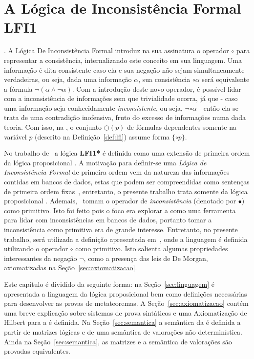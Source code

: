 \chapter{A Lógica de Inconsistência Formal LFI1}
\label{cap:LFI1}

. A Lógica De Inconsistência Formal \lfium{} introduz na sua assinatura o operador $\circ$ para representar a consistência, internalizando este conceito em sua linguagem. Uma informação é dita consistente caso ela e sua negação não sejam simultaneamente verdadeiras, ou seja, dada uma informação $\alpha$, sua consistência $\circ \alpha$ será equivalente a fórmula $\neg (\alpha \land \neg \alpha)$. Com a introdução deste novo operador, é possível lidar com a inconsistência de informações sem que trivialidade ocorra, já que {-} caso uma informação seja conhecidamente \textit{inconsistente}, ou seja, $\neg \circ \alpha$ {-} então ela se trata de uma contradição inofensiva, fruto do excesso de informações numa dada teoria. Com isso, na \lfium{}, o conjunto $\bigcirc(p)$ de fórmulas dependentes somente na variável $p$ (descrito na Definição~\ref{def:lfi}) assume forma $\{\circ p\}$.

No trabalho de~ a lógica \textbf{LFI1*} é definida como uma extensão de primeira ordem da lógica proposicional \lfium{}. A motivação para definir-se uma \textit{Lógica de Inconsistência Formal} de primeira ordem vem da natureza das informações contidas em bancos de dados, estas que podem ser compreendidas como sentenças de primeira ordem fixas~\cite{Codd}, entretanto, o presente trabalho trata somente da lógica proposicional \lfium{}. Ademais,~ tomam o operador de \textit{inconsistência} (denotado por $\bullet$) como primitivo. Isto foi feito pois o foco era explorar a \lfium{} como uma ferramenta para lidar com inconsistências em bancos de dados, portanto tomar a inconsistência como primitiva era de grande interesse. Entretanto, no presente trabalho, será utilizada a definição apresentada em~, onde a linguagem é definida utilizando o operador $\circ$ como primitivo. Isto salienta algumas propriedades interessantes da negação $\neg$, como a presença das leis de De Morgan, axiomatizadas na Seção~\ref{sec:axiomatizacao}.

Este capítulo é dividido da seguinte forma: na Seção~\ref{sec:linguagem} é apresentada a linguagem da lógica proposicional \lfium{} bem como definições necessárias para desenvolver as provas de metateoremas. A Seção~\ref{sec:axiomatizacao} contém uma breve explicação sobre sistemas de prova sintáticos e uma Axiomatização de Hilbert para a \lfium{} é definida. Na Seção~\ref{sec:semantica} a semântica da \lfium{} é definida a partir de matrizes lógicas e de uma semântica de valorações não determinística. Ainda na Seção~\ref{sec:semantica}, as matrizes e a semântica de valorações são provadas equivalentes. 

